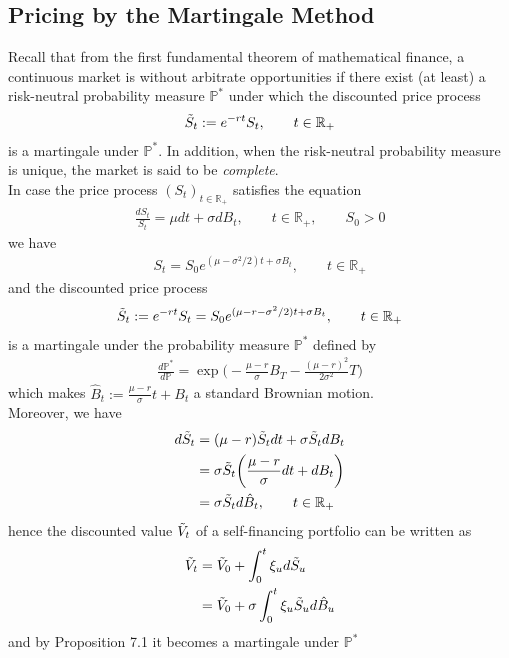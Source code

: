 \documentclass[12pt]{extarticle}
\newcommand{\<}{\langle}
\renewcommand{\>}{\rangle}
\theoremstyle{definition}
\begin{document}
\subsection{Pricing by the Martingale Method}
Recall that from the first fundamental theorem of mathematical finance, a continuous market is without arbitrate opportunities if there exist (at least) a risk-neutral probability measure $\mathbb{P}^*$ under which the discounted price process
\begin{align*}
    \Tilde{S}_t := e^{-rt}S_t, \qquad t \in \mathbb{R}_+
\end{align*}
is a martingale under $\mathbb{P}^*$. In addition, when the risk-neutral probability measure is unique, the market is said to be \textit{complete}.\\
In case the price process $(S_t)_{t \in \mathbb{R}_+}$ satisfies the equation
\begin{align*}
    \frac{dS_t}{S_t} = \mu dt + \sigma dB_t, \qquad t\in \mathbb{R}_+, \qquad S_0 > 0
\end{align*}
we have
\begin{align*}
    S_t = S_0 e^{(\mu -\sigma^2/2)t +\sigma B_t}, \qquad t\in \mathbb{R}_+
\end{align*}
and the discounted price process
\begin{align*}
    \Tilde{S}_t := e^{-rt}S_t = S_0 e^{(\mu -r -\sigma^2/2)t +\sigma B_t}, \qquad t\in \mathbb{R}_+
\end{align*}
is a martingale under the probability measure $\mathbb{P}^*$ defined by
\begin{align*}
    \frac{d\mathbb{P}^*}{d\mathbb{P}} = \exp \bigg( -\frac{\mu -r}{\sigma} B_T -\frac{(\mu -r)^2}{2\sigma^2}T \bigg)
\end{align*}
which makes $\hat{B}_t := \frac{\mu -r}{\sigma}t +B_t$ a standard Brownian motion.\\
Moreover, we have
\begin{align*}
    d\Tilde{S}_t &= (\mu -r) \Tilde{S}_t dt +\sigma \Tilde{S}_t dB_t\\
    &= \sigma \Tilde{S}_t\bigg(\frac{\mu -r}{\sigma}dt +dB_t \bigg)\\
    &= \sigma \Tilde{S}_t d\hat{B}_t, \qquad t \in \mathbb{R}_+
\end{align*}
hence the discounted value $\Tilde{V}_t$ of a self-financing portfolio can be written as
\begin{align*}
    \Tilde{V}_t &= \Tilde{V}_0 +\int^t_0 \xi_u d\Tilde{S}_u\\
    &= \Tilde{V}_0 +\sigma \int^t_0 \xi_u \Tilde{S}_u d\hat{B}_u
\end{align*}
and by Proposition 7.1 it becomes a martingale under $\mathbb{P}^*$
\end{document}
